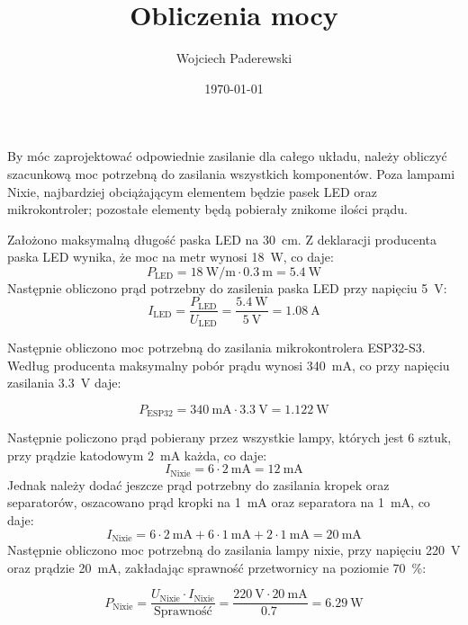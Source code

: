 \documentclass[../main.tex]{subfiles}
\author{Wojciech Paderewski}
\date{\today}
\title{Obliczenia mocy}
\begin{document}
By móc zaprojektować odpowiednie zasilanie dla całego układu, należy obliczyć szacunkową moc potrzebną do zasilania wszystkich komponentów.
Poza lampami Nixie, najbardziej obciążającym elementem będzie pasek LED oraz mikrokontroler; pozostałe elementy będą pobierały znikome ilości prądu.

Założono maksymalną długość paska LED na \SI{30}{\centi\meter}. Z deklaracji producenta paska LED wynika, że moc na metr wynosi \SI{18}{\watt}, co daje:
\begin{equation}
    P_{\text{LED}} = \SI{18}{\watt\per\meter} \cdot \SI{0.3}{\meter} = \SI{5.4}{\watt}
\end{equation}
Następnie obliczono prąd potrzebny do zasilenia paska LED przy napięciu \SI{5}{\volt}:
\begin{equation}
    I_{\text{LED}} = \frac{P_{\text{LED}}}{U_{\text{LED}}} = \frac{\SI{5.4}{\watt}}{\SI{5}{\volt}} = \SI{1.08}{\ampere}
\end{equation}

Następnie obliczono moc potrzebną do zasilania mikrokontrolera ESP32-S3. Według producenta maksymalny pobór prądu wynosi \SI{340}{\milli\ampere},
co przy napięciu zasilania \SI{3.3}{\volt} daje:

\begin{equation}
    P_{\text{ESP32}} = \SI{340}{\milli\ampere} \cdot \SI{3.3}{\volt} = \SI{1.122}{\watt}
\end{equation}

Następnie policzono prąd pobierany przez wszystkie lampy, których jest 6 sztuk, przy prądzie katodowym \SI{2}{\milli\ampere} każda, co daje:
\begin{equation}
    I_{\text{Nixie}} = 6 \cdot \SI{2}{\milli\ampere} = \SI{12}{\milli\ampere}
\end{equation}
Jednak należy dodać jeszcze prąd potrzebny do zasilania kropek oraz separatorów, oszacowano prąd kropki na \SI{1}{\milli\ampere} oraz separatora na \SI{1}{\milli\ampere}, co daje:
\begin{equation}
    I_{\text{Nixie}} = 6 \cdot \SI{2}{\milli\ampere} + 6 \cdot \SI{1}{\milli\ampere} + 2 \cdot \SI{1}{\milli\ampere} = \SI{20}{\milli\ampere}
\end{equation}
Następnie obliczono moc potrzebną do zasilania lampy nixie, przy napięciu \SI{220}{\volt} oraz prądzie \SI{20}{\milli\ampere}, zakładając 
sprawność przetwornicy na poziomie \SI{70}{\percent}:

\begin{equation}
    P_{\text{Nixie}} = \frac{U_{\text{Nixie}} \cdot I_{\text{Nixie}}}{\text{Sprawność}} = \frac{\SI{220}{\volt} \cdot \SI{20}{\milli\ampere}}{\SI{0.7}{}} = \SI{6.29}{\watt}
\end{equation}
\end{document}
